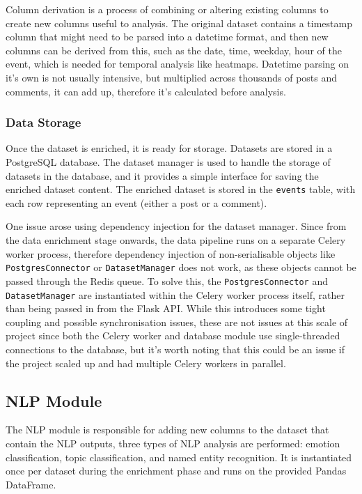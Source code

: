 \documentclass[12pt, a4paper]{article}
\begin{document}
Column derivation is a process of combining or altering existing columns to create new columns useful to analysis. The original dataset contains a timestamp column that might need to be parsed into a datetime format, and then new columns can be derived from this, such as the date, time, weekday, hour of the event, which is needed for temporal analysis like heatmaps. Datetime parsing on it's own is not usually intensive, but multiplied across thousands of posts and comments, it can add up, therefore it's calculated before analysis.

\subsubsection{Data Storage}
Once the dataset is enriched, it is ready for storage. Datasets are stored in a PostgreSQL database. The dataset manager is used to handle the storage of datasets in the database, and it provides a simple interface for saving the enriched dataset content. The enriched dataset is stored in the \texttt{events} table, with each row representing an event (either a post or a comment).

One issue arose using dependency injection for the dataset manager. Since from the data enrichment stage onwards, the data pipeline runs on a separate Celery worker process, therefore dependency injection of non-serialisable objects like \texttt{PostgresConnector} or \texttt{DatasetManager} does not work, as these objects cannot be passed through the Redis queue. To solve this, the \texttt{PostgresConnector} and \texttt{DatasetManager} are instantiated within the Celery worker process itself, rather than being passed in from the Flask API. While this introduces some tight coupling and possible synchronisation issues, these are not issues at this scale of project since both the Celery worker and database module use single-threaded connections to the database, but it's worth noting that this could be an issue if the project scaled up and had multiple Celery workers in parallel.

\subsection{NLP Module}
The NLP module is responsible for adding new columns to the dataset that contain the NLP outputs, three types of NLP analysis are performed: emotion classification, topic classification, and named entity recognition. It is instantiated once per dataset during the enrichment phase and runs on the provided Pandas DataFrame.
\end{document}
